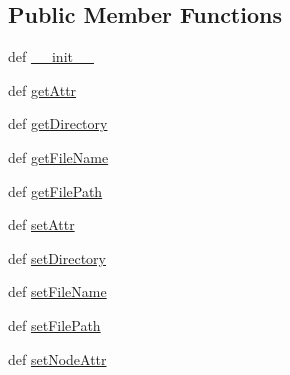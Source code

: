 \subsection*{\-Public \-Member \-Functions}
\begin{DoxyCompactItemize}
\item 
def \hyperlink{classtest_1_1mayaAssets_1_1texture_1_1textureInstance_1_1TextureInstance_a74dc349a14a61a0a346c840af762cb00}{\-\_\-\-\_\-init\-\_\-\-\_\-}
\item 
def \hyperlink{classtest_1_1mayaAssets_1_1texture_1_1textureInstance_1_1TextureInstance_a6837a7d301db7ecaba0347253339fc4f}{get\-Attr}
\item 
def \hyperlink{classtest_1_1mayaAssets_1_1texture_1_1textureInstance_1_1TextureInstance_a03d9ee63fc092f80812a4a4d5db3db82}{get\-Directory}
\item 
def \hyperlink{classtest_1_1mayaAssets_1_1texture_1_1textureInstance_1_1TextureInstance_a389dece6a6eec3d545dc31243710807a}{get\-File\-Name}
\item 
def \hyperlink{classtest_1_1mayaAssets_1_1texture_1_1textureInstance_1_1TextureInstance_a3b7b298673b42bee062be901c76cdb32}{get\-File\-Path}
\item 
def \hyperlink{classtest_1_1mayaAssets_1_1texture_1_1textureInstance_1_1TextureInstance_aad8d3b9d69781eccfa5e8891e76fb0a7}{set\-Attr}
\item 
def \hyperlink{classtest_1_1mayaAssets_1_1texture_1_1textureInstance_1_1TextureInstance_a9632f0d63fbde9b055f00e7e471ca50a}{set\-Directory}
\item 
def \hyperlink{classtest_1_1mayaAssets_1_1texture_1_1textureInstance_1_1TextureInstance_a4192c86b449e3f078352a20b0a22c501}{set\-File\-Name}
\item 
def \hyperlink{classtest_1_1mayaAssets_1_1texture_1_1textureInstance_1_1TextureInstance_a327d046dd9662eaa554a6449f70daab5}{set\-File\-Path}
\item 
def \hyperlink{classtest_1_1mayaAssets_1_1texture_1_1textureInstance_1_1TextureInstance_aa88150c1d6118b4a2848bee151ab1823}{set\-Node\-Attr}
\end{DoxyCompactItemize}


